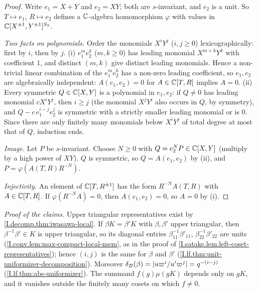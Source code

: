 \begin{lemma}
\end{lemma}
\begin{proof}
Write $e_1=X+Y$ and $e_2=XY$; both are $s$-invariant, and $e_2$ is a unit. So $T\mapsto e_1$, $R\mapsto e_2$ defines a
$\mathbb{C}$-algebra homomorphism $\varphi$ with values in $\mathbb{C}[X^{\pm1},Y^{\pm1}]^{S_2}$.

\emph{Two facts on polynomials.} Order the monomials $X^iY^j$ ($i,j\ge0$) lexicographically: first by $i$, then by
$j$. (i) $e_1^me_2^k$ ($m,k\ge0$) has leading monomial $X^{m+k}Y^k$ with coefficient $1$, and distinct $(m,k)$ give
distinct leading monomials. Hence a non-trivial linear combination of the $e_1^me_2^k$ has a non-zero leading
coefficient, so $e_1,e_2$ are algebraically independent: $A(e_1,e_2)=0$ for $A\in\mathbb{C}[T,R]$ implies $A=0$. (ii) Every
symmetric $Q\in\mathbb{C}[X,Y]$ is a polynomial in $e_1,e_2$: if $Q\neq0$ has leading monomial $cX^iY^j$, then $i\ge j$ (the
monomial $X^jY^i$ also occurs in $Q$, by symmetry), and $Q-c\,e_1^{i-j}e_2^j$ is symmetric with a strictly smaller
leading monomial or is $0$. Since there are only finitely many monomials below $X^iY^j$ of total degree at most that
of $Q$, induction ends.

\emph{Image.} Let $P$ be $s$-invariant. Choose $N\ge0$ with $Q=e_2^NP\in\mathbb{C}[X,Y]$ (multiply by a high power of
$XY$). $Q$ is symmetric, so $Q=A(e_1,e_2)$ by (ii), and $P=\varphi(A(T,R)R^{-N})$.

\emph{Injectivity.} An element of $\mathbb{C}[T,R^{\pm1}]$ has the form $R^{-N}A(T,R)$ with $A\in\mathbb{C}[T,R]$. If
$\varphi(R^{-N}A)=0$, then $A(e_1,e_2)=0$, so $A=0$ by (i).
\end{proof}

\begin{definition}
\end{definition}

\noindent\emph{Proof of the claims.} Upper triangular representatives exist by \cref{I.decomp.thm:iwasawa-local}.
If $\beta K=\beta'K$ with $\beta,\beta'$ upper triangular, then $\beta^{-1}\beta'\in K$ is upper triangular, so its
diagonal entries $\beta_{11}^{-1}\beta'_{11}$, $\beta_{22}^{-1}\beta'_{22}$ are units
(\cref{I.conv.lem:max-compact-local-mem}, as in the proof of \cref{I.satake.lem:left-coset-representatives}); hence
$(i,j)$ is the same for $\beta$ and $\beta'$ (\cref{I.lf.thm:unit-uniformizer-decomposition}). Moreover
$\delta_B(\beta)=\lvert u\varpi^i/u'\varpi^j\rvert=q^{-(i-j)}$ (\cref{I.lf.thm:abs-uniformizer}). The summand $f(g)\mu(gK)$
depends only on $gK$, and it vanishes outside the finitely many cosets on which $f\neq0$.

